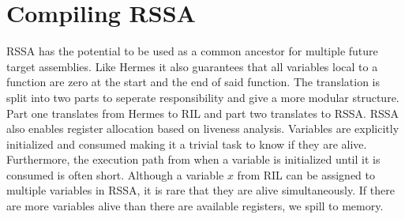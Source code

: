 \section{Compiling RSSA}
RSSA has the potential to be used as a common ancestor for multiple future target assemblies.
Like Hermes it also guarantees that all variables local to a function are zero at the start and the end of said function.
The translation is split into two parts to seperate responsibility and give a more modular structure.
Part one translates from Hermes to RIL and part two translates to RSSA.
RSSA also enables register allocation based on liveness analysis.
Variables are explicitly initialized and consumed making it a trivial task to know if they are alive.
Furthermore, the execution path from when a variable is initialized until it is consumed is often short.
Although a variable $x$ from RIL can be assigned to multiple variables in RSSA, it is rare that they are alive simultaneously.
If there are more variables alive than there are available registers, we spill to memory.


